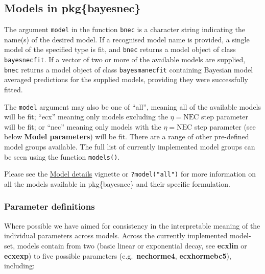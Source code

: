\documentclass[
]{jss}
\begin{document}
\hypertarget{models-in-pkgbayesnec}{%
\subsection{Models in pkg\{bayesnec\}}\label{models-in-pkgbayesnec}}

The argument \texttt{model} in the function \texttt{bnec} is a character
string indicating the name(s) of the desired model. If a recognised
model name is provided, a single model of the specified type is fit, and
\texttt{bnec} returns a model object of class \texttt{bayesnecfit}. If a
vector of two or more of the available models are supplied,
\texttt{bnec} returns a model object of class \texttt{bayesmanecfit}
containing Bayesian model averaged predictions for the supplied models,
providing they were successfully fitted.

The \texttt{model} argument may also be one of ``all'', meaning all of
the available models will be fit; ``ecx'' meaning only models excluding
the \(\eta = \text{NEC}\) step parameter will be fit; or ``nec'' meaning
only models with the \(\eta = \text{NEC}\) step parameter (see below
\textbf{Model parameters}) will be fit. There are a range of other
pre-defined model groups available. The full list of currently
implemented model groups can be seen using the function
\texttt{models()}.

Please see the
\href{https://open-aims.github.io/bayesnec/articles/example2b.html}{Model
details} vignette or \texttt{?model("all")} for more information on all
the models available in pkg\{bayesnec\} and their specific formulation.

\hypertarget{parameter-definitions}{%
\subsubsection{Parameter definitions}\label{parameter-definitions}}

Where possible we have aimed for consistency in the interpretable
meaning of the individual parameters across models. Across the currently
implemented model-set, models contain from two (basic linear or
exponential decay, see \textbf{ecxlin} or \textbf{ecxexp}) to five
possible parameters (e.g.~\textbf{nechorme4}, \textbf{ecxhormebc5}),
including:
\end{document}
